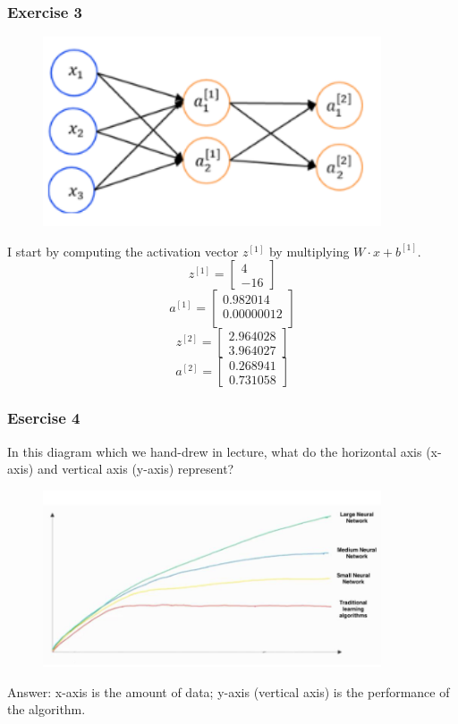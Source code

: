 \subsubsection*{Exercise 3}
\begin{figure}[htbp]
    \centering
    \includegraphics[width=10cm]{ExerciseBook/01-NeuralNetwork/exercise3.png}\newline
\end{figure}
I start by computing the activation vector $z^{[1]}$ by multiplying $W\cdot x+b^{[1]}$.
\[ 
    z^{[1]}=
    \begin{bmatrix}
        4 \\
        -16
    \end{bmatrix}
\]
\[ 
    a^{[1]}=
    \begin{bmatrix}
        0.982014 \\
        0.00000012 \\ 
    \end{bmatrix}
\]
\[ 
    z^{[2]}=
    \begin{bmatrix}
        2.964028 \\
        3.964027
    \end{bmatrix}
\]
\[ 
    a^{[2]}=
    \begin{bmatrix}
        0.268941 \\
        0.731058
    \end{bmatrix}
\]
\subsubsection*{Esercise 4}
In this diagram which we hand-drew in lecture, what do the horizontal axis (x-axis) and vertical axis (y-axis) represent?
\begin{figure}[htbp]
    \centering
    \includegraphics[width=10cm]{ExerciseBook/01-NeuralNetwork/exercise4.png}\newline
\end{figure}
Answer: x-axis is the amount of data; y-axis (vertical axis) is the performance of the algorithm.
